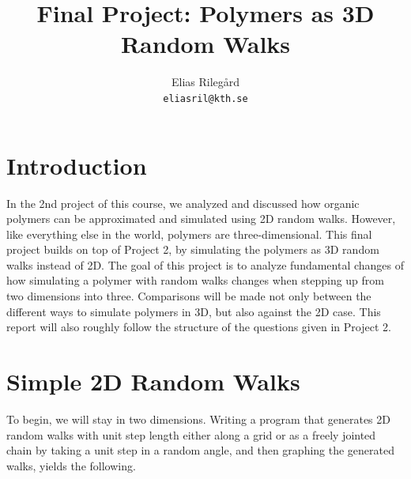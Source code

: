 \documentclass[a4paper,12pt]{article}
\title{Final Project: Polymers as 3D Random Walks}
\author{
  Elias Rilegård\\
  \texttt{eliasril@kth.se}
}
\begin{document}
\maketitle

\section*{Introduction}

In the 2nd project of this course, we analyzed and discussed how organic polymers can be approximated and simulated
using 2D random walks. However, like everything else in the world, polymers are three-dimensional. This final
project builds on top of Project 2, by simulating the polymers as 3D random walks instead of 2D. The goal of this
project is to analyze fundamental changes of how simulating a polymer with random walks changes when stepping up
from two dimensions into three. Comparisons will be made not only between the different ways to simulate polymers
in 3D, but also against the 2D case. This report will also roughly follow the structure of the questions given in
Project 2.




\section*{Simple 2D Random Walks}

To begin, we will stay in two dimensions. Writing a program that generates 2D random walks with unit step length
either along a grid or as a freely jointed chain by taking a unit step in a random angle, and then graphing the
generated walks, yields the following.
\end{document}

